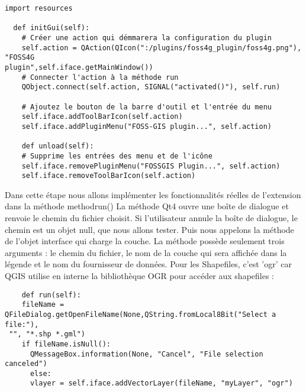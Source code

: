 \begin{verbatim}
import resources

  def initGui(self):
    # Créer une action qui démmarera la configuration du plugin
    self.action = QAction(QIcon(":/plugins/foss4g_plugin/foss4g.png"), "FOSS4G
plugin",self.iface.getMainWindow())
    # Connecter l'action à la méthode run
    QObject.connect(self.action, SIGNAL("activated()"), self.run)

    # Ajoutez le bouton de la barre d'outil et l'entrée du menu
    self.iface.addToolBarIcon(self.action)
    self.iface.addPluginMenu("FOSS-GIS plugin...", self.action)

    def unload(self):
    # Supprime les entrées des menu et de l'icône
    self.iface.removePluginMenu("FOSSGIS Plugin...", self.action)
    self.iface.removeToolBarIcon(self.action)
\end{verbatim}


Dans cette étape nous allons implémenter les fonctionnalités réelles de l'extension
dans la méthode method{run()} La méthode Qt4
 ouvre une boîte de dialogue et renvoie le
chemin du fichier choisit. Si l'utilisateur annule la boîte de dialogue, le
chemin est un objet null, que nous allons tester. Puis nous appelons la méthode
 de l'objet interface qui charge la couche. La méthode
possède seulement trois arguments : le chemin du fichier, le nom de la couche
qui sera affichée dans la légende et le nom du fournisseur de données. Pour les
Shapefiles, c'est 'ogr' car QGIS utilise en interne la bibliothèque OGR pour
accéder aux shapefiles :

\begin{verbatim}
    def run(self):
    fileName = QFileDialog.getOpenFileName(None,QString.fromLocal8Bit("Select a file:"),
 "", "*.shp *.gml")
    if fileName.isNull():
      QMessageBox.information(None, "Cancel", "File selection canceled")
      else:
      vlayer = self.iface.addVectorLayer(fileName, "myLayer", "ogr")
\end{verbatim}


